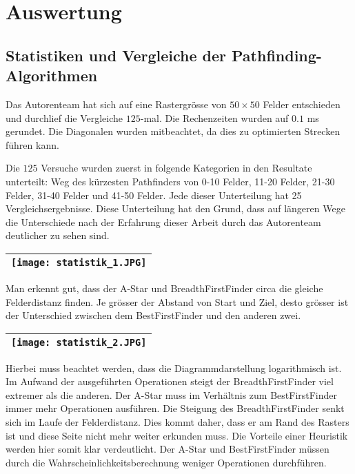 \chapter{Auswertung}
\section{Statistiken und Vergleiche der Pathfinding-Algorithmen}
\begin{center}
\end{center}

Das Autorenteam hat sich auf eine Rastergrösse von $50\times 50$ Felder
entschieden und durchlief die Vergleiche $125$-mal. Die Rechenzeiten wurden
auf $0.1$ ms gerundet. Die Diagonalen wurden mitbeachtet, da dies zu
optimierten Strecken führen kann.

Die $125$ Versuche wurden zuerst in folgende Kategorien in den Resultate
unterteilt: Weg des kürzesten Pathfinders von 0-10 Felder, 11-20 Felder,
21-30 Felder, 31-40 Felder und 41-50 Felder. Jede dieser Unterteilung hat
25 Vergleichsergebnisse. Diese Unterteilung hat den Grund, dass auf
längeren Wege die Unterschiede nach der Erfahrung dieser Arbeit durch
das Autorenteam deutlicher zu sehen sind.

\begin{longtable}[]{@{}l@{}}
\toprule
\endhead
\texttt{[image: statistik\_1.JPG]}\tabularnewline
\bottomrule
\end{longtable}

Man erkennt gut, dass der A-Star und BreadthFirstFinder circa die gleiche
Felderdistanz finden. Je grösser der Abstand von Start und Ziel, desto grösser ist der Unterschied zwischen dem BestFirstFinder und den anderen zwei.

\begin{longtable}[]{@{}l@{}}
\toprule
\endhead
\texttt{[image: statistik\_2.JPG]}\tabularnewline
\bottomrule
\end{longtable}

Hierbei muss beachtet werden, dass die Diagrammdarstellung logarithmisch ist. Im Aufwand der
ausgeführten Operationen steigt der BreadthFirstFinder viel extremer als
die anderen. Der A-Star muss im Verhältnis zum BestFirstFinder immer
mehr Operationen ausführen. Die Steigung des BreadthFirstFinder senkt
sich im Laufe der Felderdistanz. Dies kommt daher, dass er am Rand des
Rasters ist und diese Seite nicht mehr weiter erkunden muss. Die
Vorteile einer Heuristik werden hier somit klar verdeutlicht. Der A-Star und
BestFirstFinder müssen durch die Wahrscheinlichkeitsberechnung weniger
Operationen durchführen.

